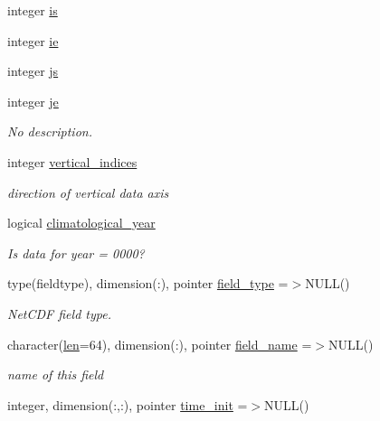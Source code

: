 \begin{DoxyCompactItemize}
integer \hyperlink{structinterpolator__mod_1_1interpolate__type_a700a5794c8cbe684438e65b2572a58fa}{is}
\item 
integer \hyperlink{structinterpolator__mod_1_1interpolate__type_a233573d8b270417860caa4907e6c30f0}{ie}
\item 
integer \hyperlink{structinterpolator__mod_1_1interpolate__type_aa1b2ed303e0d712c218d589863795d51}{js}
\item 
integer \hyperlink{structinterpolator__mod_1_1interpolate__type_aed85b6d49fbc4c8c4b39ac3d9853931a}{je}
\begin{DoxyCompactList}\small\item\em No description. \end{DoxyCompactList}\item 
integer \hyperlink{structinterpolator__mod_1_1interpolate__type_a1fc99882648137c3318d3ba71758b4c0}{vertical\+\_\+indices}
\begin{DoxyCompactList}\small\item\em direction of vertical data axis \end{DoxyCompactList}\item 
logical \hyperlink{structinterpolator__mod_1_1interpolate__type_acaa874a35f905cc36e6915f527ac60b1}{climatological\+\_\+year}
\begin{DoxyCompactList}\small\item\em Is data for year = 0000? \end{DoxyCompactList}\item 
type(fieldtype), dimension(\+:), pointer \hyperlink{structinterpolator__mod_1_1interpolate__type_af11c6e332932f59196bcb03ca3100dc0}{field\+\_\+type} =$>$N\+U\+LL()
\begin{DoxyCompactList}\small\item\em Net\+C\+DF field type. \end{DoxyCompactList}\item 
character(\hyperlink{namespaceinterpolator__mod_a6bd2ec3395203e1b6aba0610bfbfe16b}{len}=64), dimension(\+:), pointer \hyperlink{structinterpolator__mod_1_1interpolate__type_af8884a32f9588a0fab78c9ae4bbd5cbb}{field\+\_\+name} =$>$N\+U\+LL()
\begin{DoxyCompactList}\small\item\em name of this field \end{DoxyCompactList}\item 
integer, dimension(\+:,\+:), pointer \hyperlink{structinterpolator__mod_1_1interpolate__type_ac908a66dfd23a08bac5287c82088585f}{time\+\_\+init} =$>$N\+U\+LL()

\end{DoxyCompactItemize}
